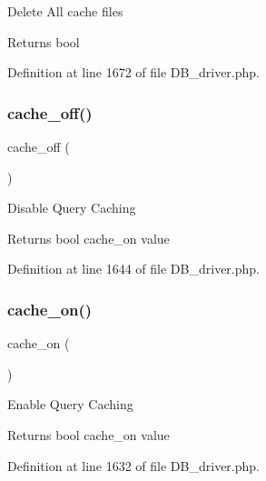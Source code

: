 Delete All cache files

\begin{DoxyReturn}{Returns}
bool 
\end{DoxyReturn}


Definition at line 1672 of file D\+B\+\_\+driver.\+php.

\mbox{\label{class_c_i___d_b__driver_ae577e2be88cb5f0d184f76dc6fd87482}} 
\subsubsection{\texorpdfstring{cache\_off()}{cache\_off()}}
{\footnotesize\ttfamily cache\+\_\+off (\begin{DoxyParamCaption}{ }\end{DoxyParamCaption})}

Disable Query Caching

\begin{DoxyReturn}{Returns}
bool cache\+\_\+on value 
\end{DoxyReturn}


Definition at line 1644 of file D\+B\+\_\+driver.\+php.

\mbox{\label{class_c_i___d_b__driver_a69ca9bb8bc31400922a565d5c4d64d8d}} 
\subsubsection{\texorpdfstring{cache\_on()}{cache\_on()}}
{\footnotesize\ttfamily cache\+\_\+on (\begin{DoxyParamCaption}{ }\end{DoxyParamCaption})}

Enable Query Caching

\begin{DoxyReturn}{Returns}
bool cache\+\_\+on value 
\end{DoxyReturn}


Definition at line 1632 of file D\+B\+\_\+driver.\+php.

\mbox{\label{class_c_i___d_b__driver_aec8df4c9b46f8ba06831911d4c3121df}} 
